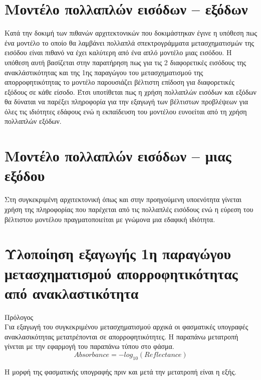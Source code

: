 \section{Μοντέλο πολλαπλών εισόδων -- εξόδων}
Κατά την δοκιμή των πιθανών αρχιτεκτονικών που δοκιμάστηκαν έγινε η υπόθεση πως ένα μοντέλο το οποίο θα λαμβάνει πολλαπλά σπεκτρογράμματα μετασχηματισμών της εισόδου είναι πιθανό να έχει καλύτερη από ένα απλό μοντέλο μιας εισόδου. Η υπόθεση αυτή βασίζεται στην παρατήρηση πως για τις 2 διαφορετικές εισόδους της ανακλάστικότητας και της 1ης παραγώγου του μετασχηματισμού   της απορροφητικότητας το μοντέλο παρουσιάζει βέλτιστη επίδοση για διαφορετικές εξόδους σε κάθε είσοδο. Έτσι υποτίθεται πως η χρήση πολλαπλών εισόδων και εξόδων θα δύναται να παρέξει πληροφορία για την εξαγωγή των βέλτιστων προβλέψεων για όλες τις ιδιότητες εδάφους ενώ η εκπαίδευση του μοντέλου ευνοείται από τη χρήση πολλαπλών εξόδων.

\section{Μοντέλο πολλαπλών εισόδων -- μιας εξόδου}
Στη συγκεκριμένη αρχιτεκτονική όπως και στην προηγούμενη υποενότητα γίνεται χρήση της πληροφορίας που παρέχεται από τις πολλαπλές εισόδους ενώ η εύρεση του βέλτιστου μοντέλου πραγματοποιείται με γνώμονα μια εδαφική ιδιότητα.

\section{Υλοποίηση εξαγωγής 1η παραγώγου μετασχηματισμού  απορροφητικότητας από ανακλαστικότητα}
Πρόλογος\\
Για εξαγωγή του συγκεκριμένου μετασχηματισμού αρχικά οι φασματικές υπογραφές ανακλασικότητας μετατρέπονται σε απορροφητικότητες. Η παραπάνω μετατροπή γίνεται με την εφαρμογή του παραπάνω τύπου στο φάσμα.
$$Absorbance=-log_{10}(Reflectance)$$


Η μορφή της φασματικής υπογραφής πριν και μετά την μετατροπή είναι η εξής.\\

